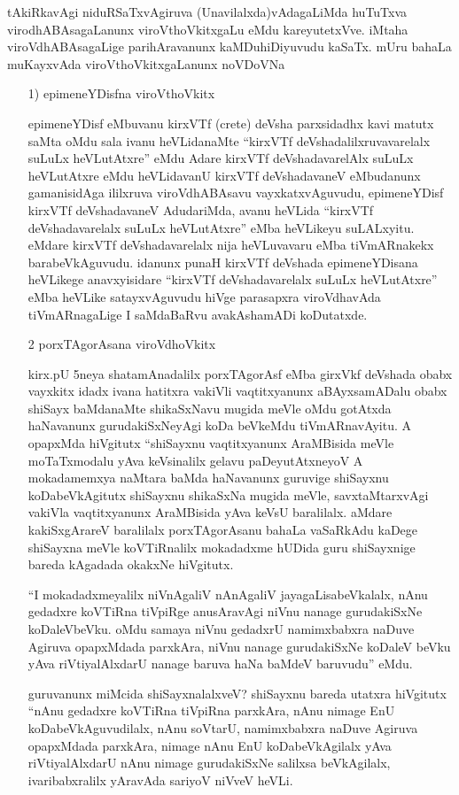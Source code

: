 tAkiRkavAgi niduRSaTxvAgiruva (Unavilalxda)vAdagaLiMda huTuTxva virodhABAsa\-gaLanunx viroVthoVkitxgaLu eMdu kareyutetxVve. iMtaha viroVdhABAsagaLige parihAravanunx kaMDuhiDiyuvudu kaSaTx. mUru bahaLa muKayxvAda viroVthoVkitxgaLanunx noVDoVNa
\begin{itemize}
\item[{\rm 1)}] epimeneYDisfna viroVthoVkitx

epimeneYDisf eMbuvanu kirxVTf {\rm (crete)} deVsha parxsidadhx kavi matutx saMta oMdu sala ivanu heVLidanaMte ``kirxVTf deVshadalilxruvavarelalx suLuLx heVLutAtxre'' eMdu Adare kirxVTf deVshadavarelAlx suLuLx heVLutAtxre eMdu heVLidavanU kirxVTf deVsha\-davaneV eMbudanunx gamanisidAga ililxruva viroVdhABAsavu vayxkatxvAguvudu, epimeneYDisf kirxVTf deVshadavaneV AdudariMda, avanu heVLida ``kirxVTf deVshadavarelalx suLuLx heVLutAtxre'' eMba heVLikeyu suLALxyitu. eMdare kirxVTf deVshadavarelalx nija heVLuvavaru eMba tiVmARnakekx barabeVkAguvudu. idanunx punaH kirxVTf deVshada epimeneYDisana heVLikege anavxyisidare ``kirxVTf deVshadavarelalx suLuLx heVLutAtxre'' eMba heVLike satayxvAguvudu hiVge parasapxra viroVdhavAda tiVmARnagaLige I saMdaBaRvu avakAshamADi koDutatxde.
\item[{\rm 2}] porxTAgorAsana viroVdhoVkitx

kirx.pU {\rm 5}neya shatamAnadalilx porxTAgorAsf eMba girxVkf deVshada obabx vayxkitx idadx ivana hatitxra vakiVli vaqtitxyanunx aBAyxsamADalu obabx shiSayx baMdanaMte shikaSxNavu mugida meVle oMdu gotAtxda haNavanunx gurudakiSxNeyAgi koDa beVkeMdu tiVmARnavAyitu. A opapxMda hiVgitutx ``shiSayxnu vaqtitxyanunx AraMBisida meVle moTaTxmodalu yAva keVsinalilx gelavu paDeyutAtxneyoV A mokadamemxya naMtara baMda haNavanunx guruvige shiSayxnu koDabeVkAgitutx shiSayxnu shikaSxNa mugida meVle, savxtaMtarxvAgi vakiVla vaqtitxyanunx AraMBisida yAva keVsU baralilalx. aMdare kakiSxgArareV baralilalx porxTAgorAsanu bahaLa vaSaRkAdu kaDege shiSayxna meVle koVTiRnalilx mokadadxme hUDida guru shiSayxnige bareda kAgadada okakxNe hiVgitutx.

``I mokadadxmeyalilx niVnAgaliV nAnAgaliV jayagaLisabeVkalalx, nAnu gedadxre koVTiRna tiVpiRge anusAravAgi niVnu nanage gurudakiSxNe koDaleVbeVku. oMdu samaya niVnu gedadxrU namimxbabxra naDuve Agiruva opapxMdada parxkAra, niVnu nanage gurudakiSxNe koDaleV beVku yAva riVtiyalAlxdarU nanage baruva haNa baMdeV baruvudu'' eMdu.

guruvanunx miMcida shiSayxnalalxveV? shiSayxnu bareda utatxra hiVgitutx ``nAnu gedadxre koVTiRna tiVpiRna parxkAra, nAnu nimage EnU koDabeVkAguvudilalx, nAnu soVtarU, namimxbabxra naDuve Agiruva opapxMdada parxkAra, nimage nAnu EnU koDabeVkAgilalx yAva riVtiyalAlxdarU nAnu nimage gurudakiSxNe salilxsa beVkAgilalx, ivaribabxralilx yAravAda sariyoV niVveV heVLi.


\end{itemize}
